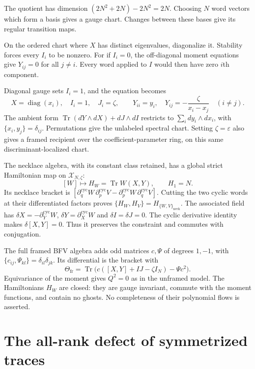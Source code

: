 The quotient has
dimension $(2N^2+2N)-2N^2=2N$. Choosing $N$ word vectors
which form a basis gives a gauge chart. Changes between these
bases give its regular transition maps.

On the ordered chart where $X$ has distinct eigenvalues,
diagonalize it. Stability forces every $I_i$ to be nonzero.
For if $I_i=0$, the off-diagonal moment equations give
$Y_{ij}=0$ for all $j\ne i$.
Every word applied to $I$ would then have zero $i$th component.

Diagonal gauge sets $I_i=1$,
and the equation becomes
\begin{equation}\label{mht:eq:framed-chart}
 X=\operatorname{diag}(x_i),\quad I_i=1,\quad J_i=\zeta,
 \qquad Y_{ii}=y_i,\quad
 Y_{ij}=-\frac{\zeta}{x_i-x_j}\quad(i\ne j).
\end{equation}
The ambient form $\operatorname{Tr}(dY\wedge dX)+dJ\wedge dI$
restricts to $\sum_i dy_i\wedge dx_i$, with
$\{x_i,y_j\}=\delta_{ij}$. Permutations give the unlabeled
spectral chart. Setting $\zeta=\varepsilon$ also gives a
framed recipient over the coefficient-parameter ring, on this
same discriminant-localized chart.

The necklace algebra, with its constant class retained, has a
global strict Hamiltonian map on $\mathcal X_{N,\zeta}$:
\begin{equation}\label{mht:eq:framed-necklace}
 [W]\longmapsto H_W=\operatorname{Tr}W(X,Y),\qquad H_1=N.
\end{equation}
Its necklace bracket is
$[\partial_q^{\mathrm{cyc}}W\,\partial_p^{\mathrm{cyc}}V
 -\partial_p^{\mathrm{cyc}}W\,\partial_q^{\mathrm{cyc}}V]$.
Cutting the two cyclic words at their differentiated factors
proves $\{H_W,H_V\}=H_{\{W,V\}_{\mathrm{neck}}}$.
The associated field has
$\delta X=-\partial_Y^{\mathrm{cyc}}W$,
$\delta Y=\partial_X^{\mathrm{cyc}}W$ and $\delta I=\delta J=0$.
The cyclic derivative identity makes $\delta[X,Y]=0$.
Thus it preserves the constraint and commutes with conjugation.

The full framed BFV algebra adds odd matrices $c,\Psi$ of
degrees $1,-1$, with
$\{c_{ij},\Psi_{kl}\}=\delta_{il}\delta_{jk}$. Its differential
is the bracket with
\[
 \Theta_{\mathrm{fr}}
 =\operatorname{Tr}\bigl(c([X,Y]+IJ-\zeta I_N)-\Psi c^2\bigr).
\]
Equivariance of the moment gives $Q^2=0$ as in the unframed
model. The Hamiltonians $H_W$ are closed: they are gauge
invariant, commute with the moment functions, and contain no
ghosts. No completeness of their polynomial flows is asserted.

\section{The all-rank defect of symmetrized traces}

